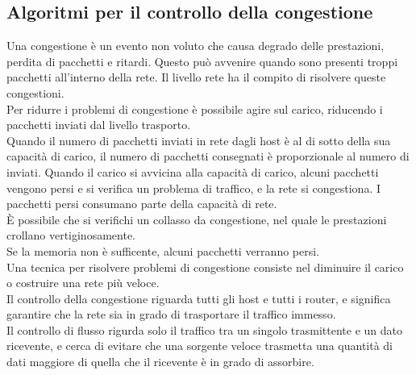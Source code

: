 \documentclass{article}
\begin{document}
\subsection{Algoritmi per il controllo della congestione}
Una congestione è un evento non voluto che causa degrado delle prestazioni, perdita di pacchetti e ritardi. Questo può avvenire quando sono presenti troppi pacchetti all'interno della rete.
Il livello rete ha  il compito di risolvere queste congestioni.\\
Per ridurre i problemi di congestione è possibile agire sul carico, riducendo i pacchetti inviati dal livello trasporto.\\
Quando il numero di pacchetti inviati in rete dagli host è al di sotto della sua capacità di carico, il numero di pacchetti consegnati è proporzionale al numero di inviati. Quando il carico si avvicina alla capacità di carico, alcuni pacchetti vengono persi e si verifica un problema di traffico, e la rete si congestiona. I pacchetti persi consumano parte della capacità di rete.\\
È possibile che si verifichi un collasso da congestione, nel quale le prestazioni crollano vertiginosamente.\\
Se la memoria non è sufficente, alcuni pacchetti verranno persi.\\
Una tecnica per risolvere problemi di congestione consiste nel diminuire il carico o costruire una rete più veloce.\\
Il controllo della congestione riguarda tutti gli host e tutti i router, e significa garantire che la rete sia in grado di trasportare il traffico immesso.\\
Il controllo di flusso rigurda solo il traffico tra un singolo trasmittente e un dato ricevente, e cerca di evitare che una sorgente veloce trasmetta una quantità di dati maggiore di quella che il ricevente è in grado di assorbire.\\
\end{document}
